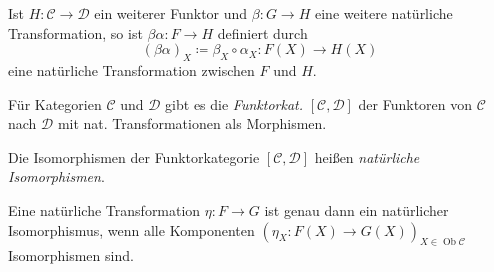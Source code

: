 \documentclass{cheat-sheet}
\DeclareMathOperator{\Ob}{Ob} %
\begin{document}
\begin{bem}
  Ist $H : \mathcal{C} \to \mathcal{D}$ ein weiterer Funktor und $\beta : G \to H$ eine weitere natürliche Transformation, so ist $\beta \alpha : F \to H$ definiert durch
  \[ (\beta \alpha)_X \coloneqq \beta_X \circ \alpha_X : F(X) \to H(X) \]
  eine natürliche Transformation zwischen $F$ und $H$.
\end{bem}

\begin{bem}
  Für Kategorien $\mathcal{C}$ und $\mathcal{D}$ gibt es die \emph{Funktorkat.} $\left[\mathcal{C}, \mathcal{D}\right]$ der Funktoren von $\mathcal{C}$ nach $\mathcal{D}$ mit nat. Transformationen als Morphismen.
\end{bem}

\begin{defn}
  Die Isomorphismen der Funktorkategorie $\left[\mathcal{C}, \mathcal{D}\right]$ heißen \emph{natürliche Isomorphismen}.
\end{defn}

\begin{lem}
  Eine natürliche Transformation $\eta : F \to G$ ist genau dann ein natürlicher Isomorphismus, wenn alle Komponenten $(\eta_X : F(X) \to G(X))_{X \in \Ob \mathcal{C}}$ Isomorphismen sind.
\end{lem}
\end{document}
